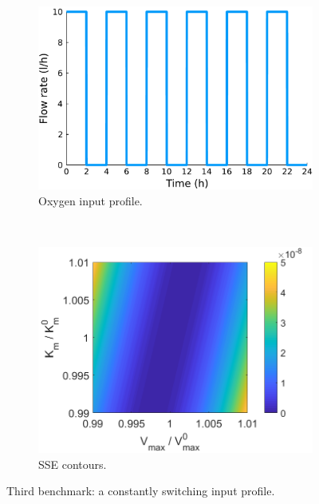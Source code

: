 \begin{figure}[H]
	\centering
	\begin{subfigure}[b]{0.45\textwidth}
		\includegraphics[width=\textwidth]{figure/paper 1/extra4}
		\caption{Oxygen input profile.}
		\label{inputcompare3}
	\end{subfigure}
	~ %
	\begin{subfigure}[b]{0.45\textwidth}
		\includegraphics[width=\textwidth]{figure/paper 1/compare3.png}
		\caption{SSE contours.}
		\label{SSEcompare3}
	\end{subfigure}
	\caption{Third benchmark: a constantly switching input profile.}
	\label{compare3}
\end{figure}
